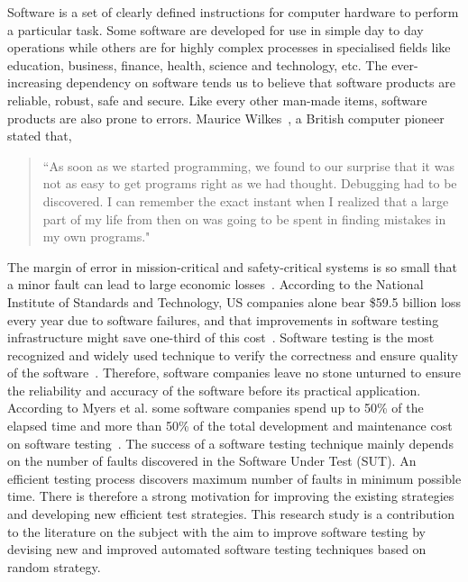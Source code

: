 Software is a set of clearly defined instructions for computer hardware to perform a particular task. Some software are developed for use in simple day to day operations while others are for highly complex processes in specialised fields like education, business, finance, health, science and technology, etc. The ever-increasing dependency on software tends us to believe that software products are reliable, robust, safe and secure. Like every other man-made items, software products are also prone to errors. Maurice Wilkes~\cite{wilkes1985memoirs}, a British computer pioneer stated that,
\smallskip
\begin{quote}
``As soon as we started programming, we found to our surprise that it was not as easy to get programs right as we had thought. Debugging had to be discovered. I can remember the exact instant when I realized that a large part of my life from then on was going to be spent in finding mistakes in my own programs."
\end{quote}
\bigskip
The margin of error in mission-critical and safety-critical systems is so small that a minor fault can lead to large economic losses~\cite{huang2004securing}. According to the National Institute of Standards and Technology, US companies alone bear \$59.5 billion loss every year due to software failures, and that improvements in software testing infrastructure might save one-third of this cost~\cite{tassey2002economic}. Software testing is the most recognized and widely used technique to verify the correctness and ensure quality of the software~\cite{patton2001software}. Therefore, software companies leave no stone unturned to ensure the reliability and accuracy of the software before its practical application. According to Myers et al. some software companies spend up to 50\% of the elapsed time and more than 50\% of the total development and maintenance cost on software testing~\cite{beizer2003software}. The success of a software testing technique mainly depends on the number of faults discovered in the Software Under Test (SUT). An efficient testing process discovers maximum number of faults in minimum possible time. There is therefore a strong motivation for improving the existing strategies and developing new efficient test strategies. This research study is a contribution to the literature on the subject with the aim to improve software testing by devising new and improved automated software testing techniques based on random strategy.

